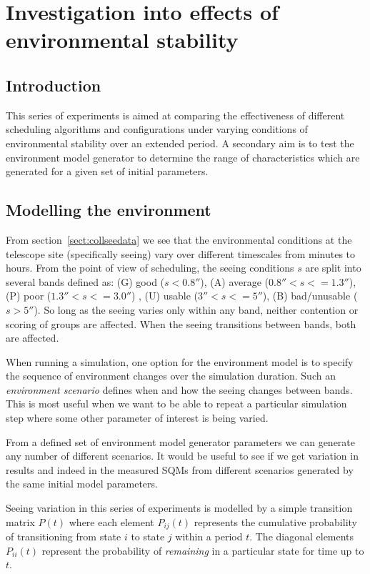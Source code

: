 \section{Investigation into effects of environmental stability}
\label{sect:exp_stability}

\subsection{Introduction}
This series of experiments is aimed at comparing the effectiveness of different scheduling algorithms and configurations under varying conditions of environmental stability over an extended period. A secondary aim is to test the environment model generator to determine the range of characteristics which are generated for a given set of initial parameters.


\subsection{Modelling the environment}
From section~\ref{sect:collseedata} we see that the environmental conditions at the telescope site (specifically seeing) vary over different timescales from minutes to hours.  From the point of view of scheduling, the seeing conditions $s$ are split into several bands defined as: (G) good ($s < 0.8''$), (A) average ($0.8'' < s <= 1.3''$), (P) poor ($1.3'' < s <= 3.0''$) , (U) usable ($3'' < s <= 5''$), (B) bad/unusable ($s > 5''$). So long as the seeing varies only within any band, neither contention or scoring of groups are affected. When the seeing transitions between bands, both are affected. 

When running a simulation, one option for the environment model is to specify the sequence of environment changes over the simulation duration. Such an \emph{environment scenario} defines when and how the seeing changes between bands. This is most useful when we want to be able to repeat a particular simulation step where some other parameter of interest is being varied.

From a defined set of environment model generator parameters we can generate any number of different scenarios. It would be useful to see if we get variation in results and indeed in the measured SQMs from different scenarios generated by the same initial model parameters. 

Seeing variation in this series of experiments is modelled by a simple transition matrix $P(t)$ where each element $P_{ij}(t)$ represents the cumulative probability of transitioning from state $i$ to state $j$ within a period $t$. The diagonal elements $P_{ii}(t)$ represent the probability of \emph{remaining} in a particular state for time up to $t$.
 
